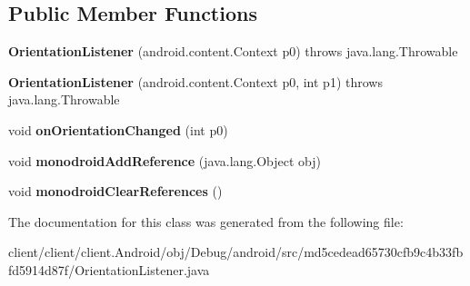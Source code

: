 \subsection*{Public Member Functions}
\begin{DoxyCompactItemize}
\item 
\hypertarget{classmd5cedead65730cfb9c4b33fbfd5914d87f_1_1OrientationListener_a320eb7ce5adeefa3240ea2ef8e9bce66}{}{\bfseries Orientation\+Listener} (android.\+content.\+Context p0)  throws java.\+lang.\+Throwable 	\label{classmd5cedead65730cfb9c4b33fbfd5914d87f_1_1OrientationListener_a320eb7ce5adeefa3240ea2ef8e9bce66}

\item 
\hypertarget{classmd5cedead65730cfb9c4b33fbfd5914d87f_1_1OrientationListener_adc3f84451d1d2946b18037a4618fc52f}{}{\bfseries Orientation\+Listener} (android.\+content.\+Context p0, int p1)  throws java.\+lang.\+Throwable 	\label{classmd5cedead65730cfb9c4b33fbfd5914d87f_1_1OrientationListener_adc3f84451d1d2946b18037a4618fc52f}

\item 
\hypertarget{classmd5cedead65730cfb9c4b33fbfd5914d87f_1_1OrientationListener_af86ed62cd1fe8daf06df0f4451e96550}{}void {\bfseries on\+Orientation\+Changed} (int p0)\label{classmd5cedead65730cfb9c4b33fbfd5914d87f_1_1OrientationListener_af86ed62cd1fe8daf06df0f4451e96550}

\item 
\hypertarget{classmd5cedead65730cfb9c4b33fbfd5914d87f_1_1OrientationListener_aafe1f1799ae3998e07bf131619f7b9ef}{}void {\bfseries monodroid\+Add\+Reference} (java.\+lang.\+Object obj)\label{classmd5cedead65730cfb9c4b33fbfd5914d87f_1_1OrientationListener_aafe1f1799ae3998e07bf131619f7b9ef}

\item 
\hypertarget{classmd5cedead65730cfb9c4b33fbfd5914d87f_1_1OrientationListener_a648715027f1cbb8bc48fcddeb48652ce}{}void {\bfseries monodroid\+Clear\+References} ()\label{classmd5cedead65730cfb9c4b33fbfd5914d87f_1_1OrientationListener_a648715027f1cbb8bc48fcddeb48652ce}

\end{DoxyCompactItemize}


The documentation for this class was generated from the following file\+:\begin{DoxyCompactItemize}
\item 
client/client/client.\+Android/obj/\+Debug/android/src/md5cedead65730cfb9c4b33fbfd5914d87f/Orientation\+Listener.\+java\end{DoxyCompactItemize}

